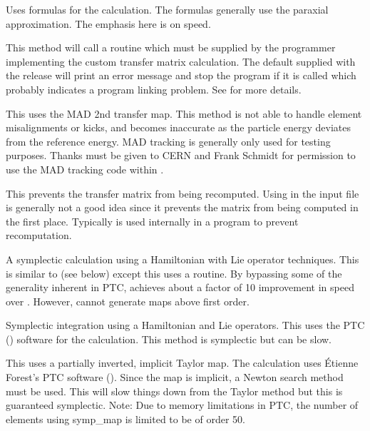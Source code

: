\begin{description}

\item[\vn{Bmad_Standard}]
Uses formulas for the calculation. The formulas generally use the
paraxial approximation. The emphasis here is on speed.

\item[\vn{Custom}]
This method will call a routine  which must be
supplied by the programmer implementing the custom transfer matrix
calculation. The default  supplied with the
\bmad release will print an error message and stop the program if it
is called which probably indicates a program linking problem.
See  for more details.

\item[\vn{MAD}]
This uses the MAD 2nd transfer map. This method is not able to
handle element misalignments or kicks, and becomes inaccurate as the
particle energy deviates from the reference energy. MAD tracking is
generally only used for testing purposes. Thanks must be given
to CERN and Frank Schmidt for permission to use the MAD tracking code
within \bmad.

\item[\vn{Static}]
This prevents the transfer matrix from being recomputed.
Using  in the input file is generally not a good idea since
it prevents the matrix from being computed in the first place.
Typically  is used internally in a program to prevent recomputation.

\item[\vn{Symp_Lie_Bmad}]
A symplectic calculation using a Hamiltonian with Lie operator
techniques.  This is similar to  (see below) except
this uses a \bmad routine. By bypassing some of the generality
inherent in PTC,  achieves about a factor
of 10 improvement in speed over . However,
 cannot generate maps above first order.

\item[\vn{Symp_Lie_PTC}]
Symplectic integration using a Hamiltonian and Lie operators.
This uses the PTC () software for the calculation.
This method is symplectic but can be slow.

\item[\vn{Symp_Map}]
This uses a partially inverted, implicit Taylor map. The calculation
uses \'Etienne Forest's PTC software ().  Since the map is implicit, a Newton
search method must be used. This will slow things down from the Taylor
method but this is guaranteed symplectic. Note: Due to memory limitations
in PTC, the number of elements using symp_map is limited to be of order 50.


\end{description}
